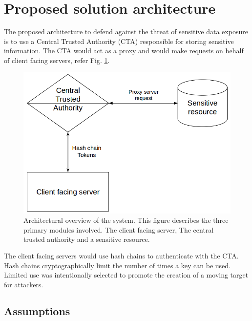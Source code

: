 \documentclass[12pt,conference]{IEEEtran}
\begin{document}
\section*{Proposed solution architecture}

The proposed architecture to defend against the threat of sensitive data exposure is to use a Central Trusted Authority (CTA) responsible for storing sensitive information. The CTA would act as a proxy and would make requests on behalf of client facing servers, refer Fig. \ref{fig:architectureoverview}.

\begin{figure}[hbtp]
\includegraphics[scale=0.3]{overview_architecture.png}
\caption{Architectural overview of the system. This figure describes the three primary modules involved. The client facing server, The central trusted authority and a sensitive resource.}
\label{fig:architectureoverview} 
\end{figure}

The client facing servers would use hash chains to authenticate with the CTA. Hash chains cryptographically limit the number of times a key can be used. Limited use was intentionally selected to promote the creation of a moving target for attackers.

\subsection*{Assumptions}
\end{document}
